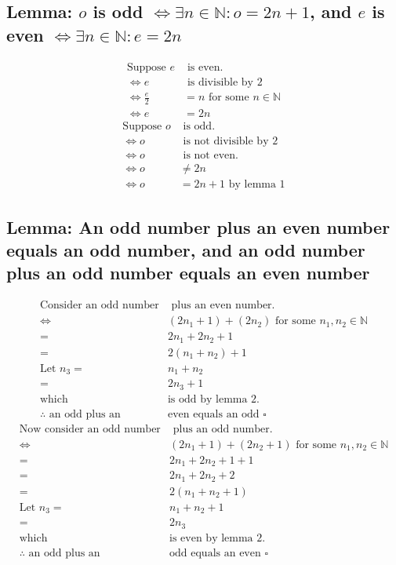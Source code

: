 \documentclass[11pt, oneside]{article}   	%
\begin{document}
	\subsection{Lemma: $o$ is odd $\iff \exists n \in \mathbb{N} : o =2n + 1$, and $e$ is even $\iff \exists n \in \mathbb{N} : e = 2n$}
		\begin{align*}
			\text{Suppose } e & \text{ is even.}\\
			\iff e & \text{ is divisible by } 2\\
			\iff \frac{e}{2} &= n \text{ for some } n \in \mathbb{N}\\
			\iff e &= 2n
		\end{align*}
		\begin{align*}
			\text{Suppose } o & \text{ is odd.}\\
			\iff o & \text{ is not divisible by } 2\\
			\iff o& \text{ is not even.}\\
			\iff o &\ne 2n\\
			\iff o &= 2n + 1 \text{ by lemma 1}
		\end{align*}

	\subsection{Lemma: An odd number plus an even number equals an odd number, and an odd number plus an odd number equals an even number}
		\begin{align*}
			\text{Consider an odd number}&\text{ plus an even number.}\\
			\iff & (2n_1+1) + (2n_2) \text{ for some } n_1, n_2 \in \mathbb{N}\\
			= & 2n_1 + 2n_2 + 1\\
			= & 2(n_1 + n_2) + 1\\
			\text{Let } n_3 =& n_1 + n_2\\
			= & 2n_3 + 1\\
			\text{which }& \text{is odd by lemma 2}.\\
			\therefore \text{ an odd plus an }&\text{even equals an odd } \square
		\end{align*}
		\begin{align*}
			\text{Now consider an odd number}&\text{ plus an odd number.}\\
			\iff & (2n_1+1) + (2n_2+1) \text{ for some } n_1, n_2 \in \mathbb{N}\\
			= & 2n_1 + 2n_2 + 1 + 1\\
			= & 2n_1 + 2n_2 + 2\\
			= & 2(n_1 + n_2 + 1)\\
			\text{Let } n_3 = & n_1 + n_2 + 1\\
			= & 2n_3\\
			\text{which }& \text{is even by lemma 2}.\\
			\therefore \text{ an odd plus an }&\text{odd equals an even } \square
		\end{align*}
\end{document}
